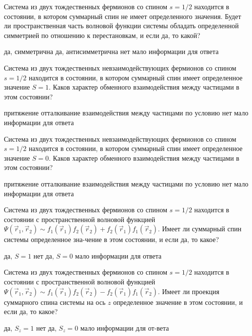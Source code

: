 \documentclass[11pt,a4paper]{exam}
\begin{document}
\begin{questions}
\question Система из двух тождественных фермионов со спином $s = 1/2$ находится в состоянии, в котором суммарный спин не имеет определенного значения. Будет ли пространственная часть волновой функции системы обладать определенной симметрией по отношению к перестановкам, и если да, то какой?
\begin{choices}
\choice да, симметрична      
\choice да, антисимметрична
\choice нет            
\choice мало информации для ответа
\end{choices}

\question Система из двух тождественных невзаимодействующих фермионов со спином $s = 1/2$ находится в состоянии, в котором суммарный спин имеет определенное значение $S = 1$. Каков характер обменного взаимодействия между частицами в этом состоянии?
\begin{choices}
\choice притяжение
\choice отталкивание
\choice взаимодействия между частицами по условию нет
\choice мало информации для ответа
\end{choices}

\question Система из двух тождественных невзаимодействующих фермионов со спином $s = 1/2$ находится в состоянии, в котором суммарный спин имеет определенное значение $S = 0$. Каков характер обменного взаимодействия между частицами в этом состоянии?
\begin{choices}
\choice притяжение
\choice отталкивание
\choice взаимодействия между частицами по условию нет
\choice мало информации для ответа
\end{choices}

\question Система из двух тождественных фермионов со спином $s = 1/2$ находится в состоянии с пространственной волновой функцией $\Psi ({\vec r_1},{\vec r_2}) \sim {f_1}({\vec r_1}){f_2}({\vec r_2}) + {f_2}({\vec r_1}){f_1}({\vec r_2})$. Имеет ли суммарный спин системы определенное зна-чение в этом состоянии, и если да, то какое?
\begin{choices}
\choice да, $S = 1$    
\choice нет      
\choice да, $S = 0$    
\choice мало информации для ответа
\end{choices}

\question Система из двух тождественных фермионов со спином $s = 1/2$ находится в состоянии с пространственной волновой функцией $\Psi ({\vec r_1},{\vec r_2}) \sim {f_1}({\vec r_1}){f_2}({\vec r_2}) - {f_2}({\vec r_1}){f_1}({\vec r_2})$. Имеет ли проекция суммарного спина системы на ось $z$ определенное значение в этом состоянии, и если да, то какое?
\begin{choices}
\choice да, ${S_z} = 1$      
\choice нет      
\choice да, ${S_z} = 0$      
\choice мало информации для от-вета
\end{choices}


\end{questions}
\end{document}
